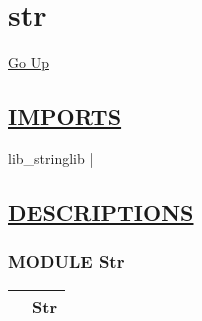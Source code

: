 \chapter*{\color{headfile}
str
}
\hypertarget{ecldoc:toc:str}{}
\hyperlink{ecldoc:toc:root}{Go Up}

\section*{\underline{\textsf{IMPORTS}}}
\begin{doublespace}
{\large
lib\_stringlib |
}
\end{doublespace}

\section*{\underline{\textsf{DESCRIPTIONS}}}
\subsection*{\textsf{\colorbox{headtoc}{\color{white} MODULE}
Str}}

\hypertarget{ecldoc:Str}{}

{\renewcommand{\arraystretch}{1.5}
\begin{tabularx}{\textwidth}{|>{\raggedright\arraybackslash}l|X|}
\hline
\hspace{0pt}\mytexttt{\color{red} } & \textbf{Str} \\
\hline
\end{tabularx}
}

\par


